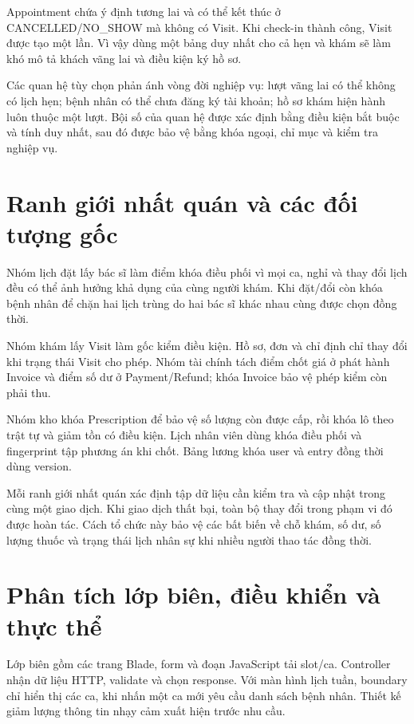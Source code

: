 Appointment chứa ý định tương lai và có thể kết thúc ở CANCELLED/\allowbreak{}NO\_\allowbreak{}SHOW mà không có Visit.\allowbreak{} Khi check-in thành công, Visit được tạo một lần.\allowbreak{} Vì vậy dùng một bảng duy nhất cho cả hẹn và khám sẽ làm khó mô tả khách vãng lai và điều kiện ký hồ sơ.\allowbreak{}

Các quan hệ tùy chọn phản ánh vòng đời nghiệp vụ:\allowbreak{} lượt vãng lai có thể không có lịch hẹn; bệnh nhân có thể chưa đăng ký tài khoản; hồ sơ khám hiện hành luôn thuộc một lượt.\allowbreak{} Bội số của quan hệ được xác định bằng điều kiện bắt buộc và tính duy nhất, sau đó được bảo vệ bằng khóa ngoại, chỉ mục và kiểm tra nghiệp vụ.\allowbreak{}


\section{Ranh giới nhất quán và các đối tượng gốc}
Nhóm lịch đặt lấy bác sĩ làm điểm khóa điều phối vì mọi ca, nghỉ và thay đổi lịch đều có thể ảnh hưởng khả dụng của cùng người khám.\allowbreak{} Khi đặt/\allowbreak{}đổi còn khóa bệnh nhân để chặn hai lịch trùng do hai bác sĩ khác nhau cùng được chọn đồng thời.\allowbreak{}

Nhóm khám lấy Visit làm gốc kiểm điều kiện.\allowbreak{} Hồ sơ, đơn và chỉ định chỉ thay đổi khi trạng thái Visit cho phép.\allowbreak{} Nhóm tài chính tách điểm chốt giá ở phát hành Invoice và điểm số dư ở Payment/\allowbreak{}Refund; khóa Invoice bảo vệ phép kiểm còn phải thu.\allowbreak{}

Nhóm kho khóa Prescription để bảo vệ số lượng còn được cấp, rồi khóa lô theo trật tự và giảm tồn có điều kiện.\allowbreak{} Lịch nhân viên dùng khóa điều phối và fingerprint tập phương án khi chốt.\allowbreak{} Bảng lương khóa user và entry đồng thời dùng version.\allowbreak{}

Mỗi ranh giới nhất quán xác định tập dữ liệu cần kiểm tra và cập nhật trong cùng một giao dịch.\allowbreak{} Khi giao dịch thất bại, toàn bộ thay đổi trong phạm vi đó được hoàn tác.\allowbreak{} Cách tổ chức này bảo vệ các bất biến về chỗ khám, số dư, số lượng thuốc và trạng thái lịch nhân sự khi nhiều người thao tác đồng thời.\allowbreak{}


\section{Phân tích lớp biên, điều khiển và thực thể}
Lớp biên gồm các trang Blade, form và đoạn Java\allowbreak{}Script tải slot/\allowbreak{}ca.\allowbreak{} Controller nhận dữ liệu HTTP, validate và chọn response.\allowbreak{} Với màn hình lịch tuần, boundary chỉ hiển thị các ca, khi nhấn một ca mới yêu cầu danh sách bệnh nhân.\allowbreak{} Thiết kế giảm lượng thông tin nhạy cảm xuất hiện trước nhu cầu.\allowbreak{}

